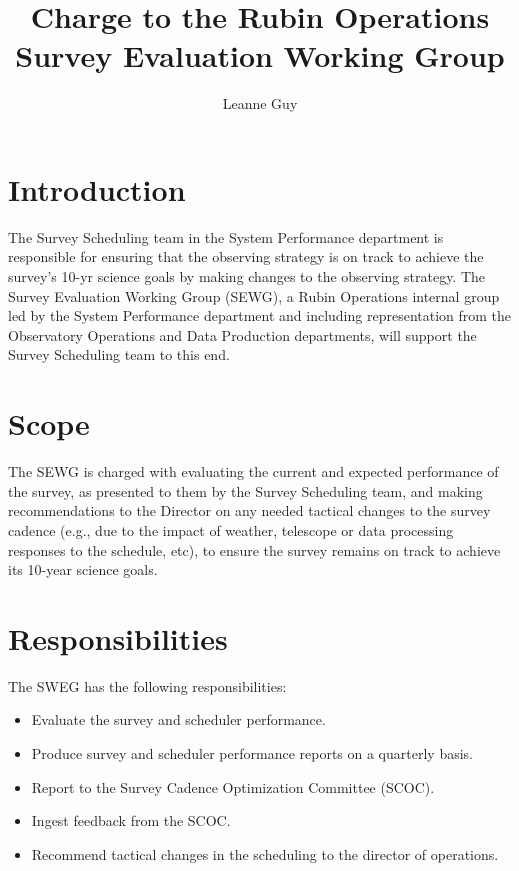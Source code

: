 \documentclass[DM,authoryear,toc]{lsstdoc}
\title{Charge to the Rubin Operations Survey Evaluation Working Group}
\author{%
Leanne Guy
}
\date{\vcsDate}
\begin{document}
\maketitle


\section{Introduction}
The Survey Scheduling team in the System Performance department is responsible for ensuring that the observing strategy is on track to achieve the survey's 10-yr science goals by making changes to the observing strategy. 
The Survey Evaluation Working Group (SEWG), a Rubin Operations internal group led by the System Performance department and including representation from the Observatory Operations and Data Production departments, will  support the Survey Scheduling team to this end. 

\section{Scope}
The SEWG is charged with evaluating the current and expected performance of the survey, as presented to them by the Survey Scheduling team, and making recommendations to the Director on any needed tactical changes to the survey cadence (e.g., due to the impact of weather, telescope or data processing responses to the schedule, etc),  to ensure the survey remains on track to achieve its 10-year science goals.  

\section{Responsibilities}
The SWEG has the following responsibilities: 
\begin{itemize}
\item Evaluate the survey and scheduler performance.
\item Produce survey and scheduler performance reports on a quarterly basis.
\item Report to the Survey Cadence Optimization Committee (SCOC).
\item Ingest feedback from the SCOC.
\item Recommend tactical changes in the scheduling to the director of operations. 
\end{itemize}
\end{document}
